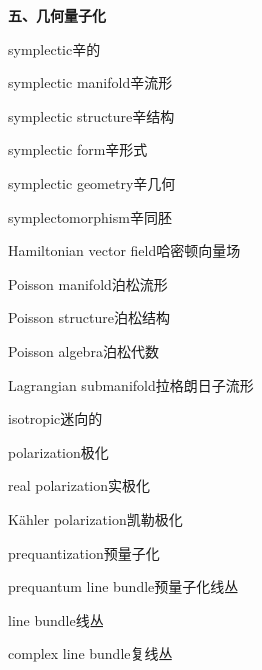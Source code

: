 \filbreak
\vspace{0.9em}
\noindent\textbf{五、几何量子化}\par\nobreak\vspace{0.35em}
\begin{multicols}{2}
\raggedright
\setlength{\parindent}{0pt}
\setlength{\parskip}{0.16em}
\linespread{1.02}\selectfont
symplectic\hspace{0.9em}辛的\par
symplectic manifold\hspace{0.9em}辛流形\par
symplectic structure\hspace{0.9em}辛结构\par
symplectic form\hspace{0.9em}辛形式\par
symplectic geometry\hspace{0.9em}辛几何\par
symplectomorphism\hspace{0.9em}辛同胚\par
Hamiltonian vector field\hspace{0.9em}哈密顿向量场\par
Poisson manifold\hspace{0.9em}泊松流形\par
Poisson structure\hspace{0.9em}泊松结构\par
Poisson algebra\hspace{0.9em}泊松代数\par
Lagrangian submanifold\hspace{0.9em}拉格朗日子流形\par
isotropic\hspace{0.9em}迷向的\par
polarization\hspace{0.9em}极化\par
real polarization\hspace{0.9em}实极化\par
Kähler polarization\hspace{0.9em}凯勒极化\par
prequantization\hspace{0.9em}预量子化\par
prequantum line bundle\hspace{0.9em}预量子化线丛\par
line bundle\hspace{0.9em}线丛\par
complex line bundle\hspace{0.9em}复线丛\par

\end{multicols}
